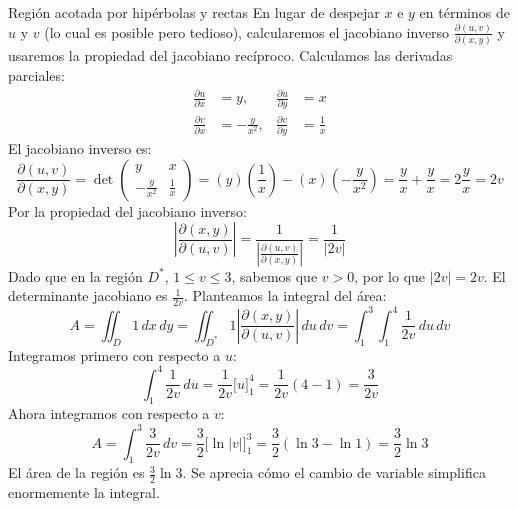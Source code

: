 \documentclass[11pt,a4paper]{article}
\begin{document}
\begin{ejerciciobox}{Región acotada por hipérbolas y rectas}
En lugar de despejar $x$ e $y$ en términos de $u$ y $v$ (lo cual es posible pero tedioso), calcularemos el jacobiano inverso $\frac{\partial(u,v)}{\partial(x,y)}$ y usaremos la propiedad del jacobiano recíproco.
Calculamos las derivadas parciales:
\begin{align*}
\frac{\partial u}{\partial x} &= y, & \frac{\partial u}{\partial y} &= x \\
\frac{\partial v}{\partial x} &= -\frac{y}{x^2}, & \frac{\partial v}{\partial y} &= \frac{1}{x}
\end{align*}
El jacobiano inverso es:
\begin{equation*}
\frac{\partial(u,v)}{\partial(x,y)} = \det \begin{pmatrix} y & x \\ -\frac{y}{x^2} & \frac{1}{x} \end{pmatrix} = (y)\left(\frac{1}{x}\right) - (x)\left(-\frac{y}{x^2}\right) = \frac{y}{x} + \frac{y}{x} = 2\frac{y}{x} = 2v
\end{equation*}
Por la propiedad del jacobiano inverso:
\begin{equation*}
\left| \frac{\partial(x,y)}{\partial(u,v)} \right| = \frac{1}{\left| \frac{\partial(u,v)}{\partial(x,y)} \right|} = \frac{1}{|2v|}
\end{equation*}
Dado que en la región $D^*$, $1 \le v \le 3$, sabemos que $v > 0$, por lo que $|2v| = 2v$. El determinante jacobiano es $\frac{1}{2v}$.
Planteamos la integral del área:
\begin{equation*}
A = \iint_D 1 \, dx \, dy = \iint_{D^*} 1 \left| \frac{\partial(x,y)}{\partial(u,v)} \right| \, du \, dv = \int_{1}^{3} \int_{1}^{4} \frac{1}{2v} \, du \, dv
\end{equation*}
Integramos primero con respecto a $u$:
\begin{equation*}
\int_{1}^{4} \frac{1}{2v} \, du = \frac{1}{2v} \Big[ u \Big]_{1}^{4} = \frac{1}{2v} (4 - 1) = \frac{3}{2v}
\end{equation*}
Ahora integramos con respecto a $v$:
\begin{equation*}
A = \int_{1}^{3} \frac{3}{2v} \, dv = \frac{3}{2} \Big[ \ln|v| \Big]_{1}^{3} = \frac{3}{2} (\ln 3 - \ln 1) = \frac{3}{2} \ln 3
\end{equation*}
El área de la región es $\frac{3}{2} \ln 3$. Se aprecia cómo el cambio de variable simplifica enormemente la integral.
\end{ejerciciobox}
\end{document}

